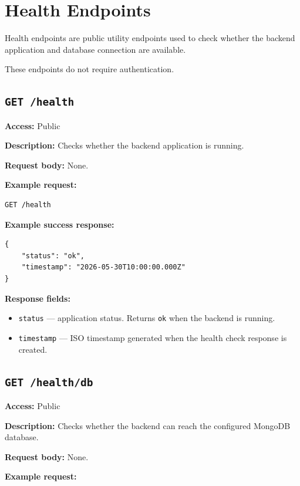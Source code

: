 \section{Health Endpoints}

Health endpoints are public utility endpoints used to check whether the backend application and database connection are available.

These endpoints do not require authentication.

\subsection{\texttt{GET /health}}

\textbf{Access:} Public

\textbf{Description:} Checks whether the backend application is running.

\textbf{Request body:} None.

\textbf{Example request:}

\begin{verbatim}
GET /health
\end{verbatim}

\textbf{Example success response:}

\begin{verbatim}
{
    "status": "ok",
    "timestamp": "2026-05-30T10:00:00.000Z"
}
\end{verbatim}

\textbf{Response fields:}

\begin{itemize}
    \item \texttt{status} --- application status. Returns \texttt{ok} when the backend is running.
    \item \texttt{timestamp} --- ISO timestamp generated when the health check response is created.
\end{itemize}

\subsection{\texttt{GET /health/db}}

\textbf{Access:} Public

\textbf{Description:} Checks whether the backend can reach the configured MongoDB database.

\textbf{Request body:} None.

\textbf{Example request:}

